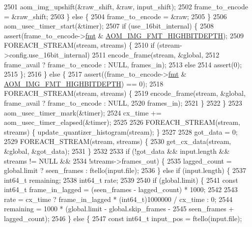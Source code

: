 \begin{DoxyCodeInclude}
{{{{{{{{{{{{{{{{{{{{{{{{{{{{{{{{{{{{{{{{{{{{{{{{{{{{{{{{{{{2501           aom\_img\_upshift(&raw\_shift, &raw, input\_shift);
2502           frame\_to\_encode = &raw\_shift;
2503         \} \textcolor{keywordflow}{else} \{
2504           frame\_to\_encode = &raw;
2505         \}
2506         aom\_usec\_timer\_start(&timer);
2507         \textcolor{keywordflow}{if} (use\_16bit\_internal) \{
2508           assert(frame\_to\_encode->\hyperlink{structaom__image_a6c64b1ab918d80d52eb8f5d6d957e825}{fmt} & \hyperlink{aom__image_8h_a607b37d91f75442f54223ecd85f1b6cb}{AOM\_IMG\_FMT\_HIGHBITDEPTH});
2509           FOREACH\_STREAM(stream, streams) \{
2510             \textcolor{keywordflow}{if} (stream->config.use\_16bit\_internal)
2511               encode\_frame(stream, &global,
2512                            frame\_avail ? frame\_to\_encode : NULL, frames\_in);
2513             \textcolor{keywordflow}{else}
2514               assert(0);
2515           \};
2516         \} \textcolor{keywordflow}{else} \{
2517           assert((frame\_to\_encode->\hyperlink{structaom__image_a6c64b1ab918d80d52eb8f5d6d957e825}{fmt} & \hyperlink{aom__image_8h_a607b37d91f75442f54223ecd85f1b6cb}{AOM\_IMG\_FMT\_HIGHBITDEPTH}) == 0);
2518           FOREACH\_STREAM(stream, streams) \{
2519             encode\_frame(stream, &global, frame\_avail ? frame\_to\_encode : NULL,
2520                          frames\_in);
2521           \}
2522         \}
2523         aom\_usec\_timer\_mark(&timer);
2524         cx\_time += aom\_usec\_timer\_elapsed(&timer);
2525 
2526         FOREACH\_STREAM(stream, streams) \{ update\_quantizer\_histogram(stream); \}
2527 
2528         got\_data = 0;
2529         FOREACH\_STREAM(stream, streams) \{
2530           get\_cx\_data(stream, &global, &got\_data);
2531         \}
2532 
2533         \textcolor{keywordflow}{if} (!got\_data && input.length && streams != NULL &&
2534             !streams->frames\_out) \{
2535           lagged\_count = global.limit ? seen\_frames : ftello(input.file);
2536         \} \textcolor{keywordflow}{else} \textcolor{keywordflow}{if} (input.length) \{
2537           int64\_t remaining;
2538           int64\_t rate;
2539 
2540           \textcolor{keywordflow}{if} (global.limit) \{
2541             \textcolor{keyword}{const} int64\_t frame\_in\_lagged = (seen\_frames - lagged\_count) * 1000;
2542 
2543             rate = cx\_time ? frame\_in\_lagged * (int64\_t)1000000 / cx\_time : 0;
2544             remaining = 1000 * (global.limit - global.skip\_frames -
2545                                 seen\_frames + lagged\_count);
2546           \} \textcolor{keywordflow}{else} \{
2547             \textcolor{keyword}{const} int64\_t input\_pos = ftello(input.file);
}}}}}}}}}}}}}}}}}}}}}}}}}}}}}}}}}}}}}}}}}}}}}}}}}}}}}}}}}}}
\end{DoxyCodeInclude}
